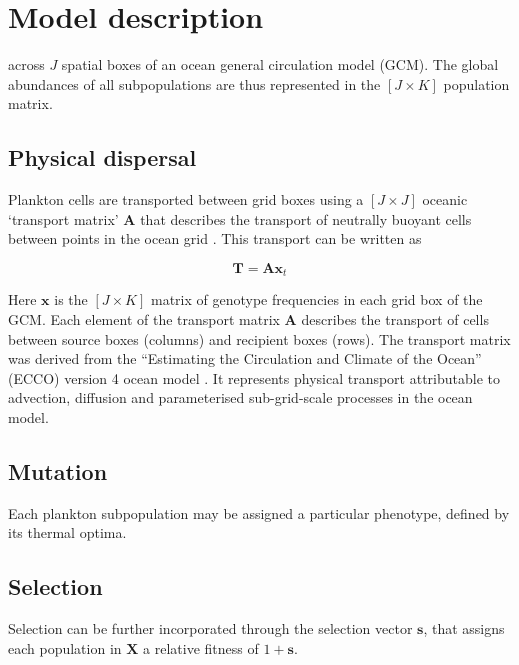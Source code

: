 \documentclass[12pt]{article}
\begin{document}
\section{Model description}





across $J$ spatial boxes of an ocean general circulation model (GCM). The global abundances of all subpopulations are thus represented in the $[J\times K]$ population matrix.



\subsection*{Physical dispersal}

Plankton cells are transported between grid boxes using a $[J\times J]$ oceanic `transport matrix' $\mathbf{A}$ that describes the transport of neutrally buoyant cells between points in the ocean grid \citep{Khatiwala:2005}. This transport can be written as 

\begin{equation}
\label{ }
\mathbf{T} = \mathbf{A}\mathbf{x}_{t}
\end{equation}

Here $\mathbf{x}$ is the $[J\times K]$ matrix of genotype frequencies in each grid box of the GCM. Each element of the transport matrix $\mathbf{A}$ describes the transport of cells between source boxes (columns) and recipient boxes (rows). The transport matrix was derived from the ``Estimating the Circulation and Climate of the Ocean'' (ECCO) version 4 ocean model \citep{}. It represents physical transport attributable to advection, diffusion and parameterised sub-grid-scale processes in the ocean model. 

\subsection*{Mutation}

Each plankton subpopulation may be assigned a particular phenotype, defined by its thermal optima.

\subsection*{Selection}



Selection can be further incorporated through the selection vector $\mathbf{s}$, that assigns each population in $\mathbf{X}$ a relative fitness of $1+\mathbf{s}$.
\end{document}
